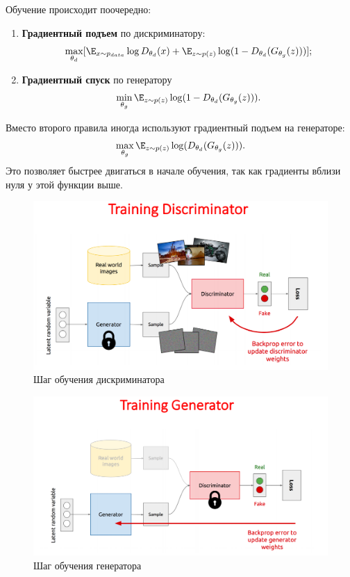 Обучение происходит поочередно:
\begin{enumerate}
    \item \textbf{Градиентный подъем} по дискриминатору:
    \[
        \max_{\theta_d}[\E_{x\sim p_{data}}\log D_{\theta_d}(x)+\E_{z\sim p(z)}\log(1-D_{\theta_d}(G_{\theta_g}(z)))];
    \]
    \item \textbf{Градиентный спуск} по генератору
    \[
        \min_{\theta_g}\E_{z\sim p(z)}\log(1-D_{\theta_d}(G_{\theta_g}(z))).
    \]
\end{enumerate}

\begin{remark}
    Вместо второго правила иногда используют градиентный подъем на генераторе:
    \[
        \max_{\theta_g}\E_{z\sim p(z)}\log(D_{\theta_d}(G_{\theta_g}(z))).
    \]
    Это позволяет быстрее двигаться в начале обучения, так как градиенты вблизи нуля у этой функции выше.
\end{remark}

\begin{figure}[h]
    \centering
    \includegraphics[width=\textwidth]{images/training-discriminator.png}
    \caption{Шаг обучения дискриминатора}
\end{figure}

\begin{figure}[h]
    \centering
    \includegraphics[width=\textwidth]{images/training-generator.png}
    \caption{Шаг обучения генератора}
\end{figure}

